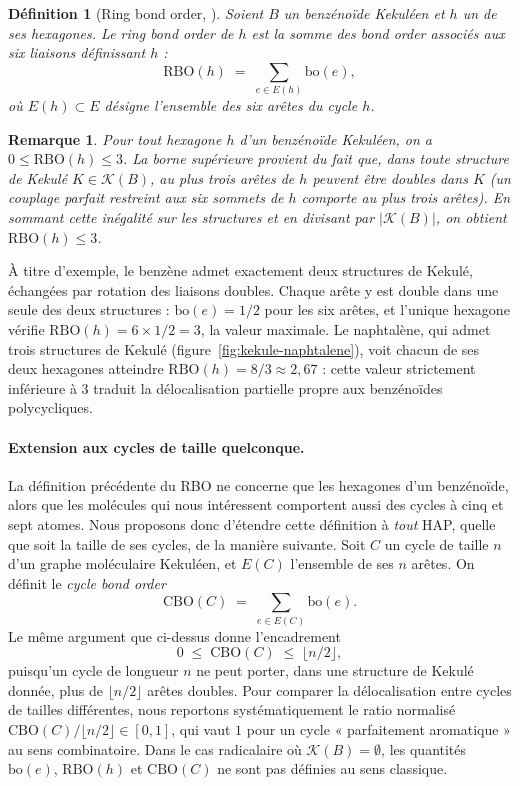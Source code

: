 \documentclass[11pt,a4paper]{article}
\newtheorem{definition}{Définition}
\newtheorem{remarque}{Remarque}
\begin{document}
\begin{definition}[Ring bond order, \cite{varet2022}]
Soient $B$ un benzénoïde Kekuléen et $h$ un de ses hexagones. Le
\emph{ring bond order} de $h$ est la somme des bond order associés aux
six liaisons définissant $h$ :
\[
  \mathrm{RBO}(h) \;=\; \sum_{e \in E(h)} \mathrm{bo}(e) ,
\]
où $E(h) \subset E$ désigne l'ensemble des six arêtes du cycle $h$.
\end{definition}

\begin{remarque}
Pour tout hexagone $h$ d'un benzénoïde Kekuléen, on a
$0 \le \mathrm{RBO}(h) \le 3$. La borne supérieure provient du fait que,
dans toute structure de Kekulé $K \in \mathcal{K}(B)$, au plus
\emph{trois} arêtes de $h$ peuvent être doubles dans $K$ (un couplage
parfait restreint aux six sommets de $h$ comporte au plus trois arêtes).
En sommant cette inégalité sur les structures et en divisant par
$|\mathcal{K}(B)|$, on obtient $\mathrm{RBO}(h) \le 3$.
\end{remarque}

À titre d'exemple, le benzène admet exactement deux structures de
Kekulé, échangées par rotation des liaisons doubles. Chaque arête y est
double dans une seule des deux structures : $\mathrm{bo}(e) = 1/2$ pour
les six arêtes, et l'unique hexagone vérifie
$\mathrm{RBO}(h) = 6 \times 1/2 = 3$, la valeur maximale. Le
naphtalène, qui admet trois structures de Kekulé
(figure~\ref{fig:kekule-naphtalene}), voit chacun de ses deux hexagones
atteindre $\mathrm{RBO}(h) = 8/3 \approx 2{,}67$ : cette valeur
strictement inférieure à $3$ traduit la délocalisation partielle propre
aux benzénoïdes polycycliques.

\paragraph{Extension aux cycles de taille quelconque.}
La définition précédente du RBO ne concerne que les hexagones d'un
benzénoïde, alors que les molécules qui nous intéressent comportent
aussi des cycles à cinq et sept atomes. Nous proposons donc d'étendre
cette définition à \emph{tout} HAP, quelle que soit la taille de ses
cycles, de la manière suivante. Soit $C$ un cycle de
taille $n$ d'un graphe moléculaire Kekuléen, et $E(C)$ l'ensemble de ses
$n$ arêtes. On définit le \emph{cycle bond order}
\[
  \mathrm{CBO}(C) \;=\; \sum_{e \in E(C)} \mathrm{bo}(e) .
\]
Le même argument que ci-dessus donne l'encadrement
\[
  0 \;\le\; \mathrm{CBO}(C) \;\le\; \lfloor n/2 \rfloor ,
\]
puisqu'un cycle de longueur $n$ ne peut porter, dans une structure de
Kekulé donnée, plus de $\lfloor n/2 \rfloor$ arêtes doubles. Pour
comparer la délocalisation entre cycles de tailles différentes, nous
reportons systématiquement le ratio normalisé
$\mathrm{CBO}(C) / \lfloor n/2 \rfloor \in [0, 1]$, qui vaut $1$ pour
un cycle « parfaitement aromatique » au sens combinatoire. Dans le cas
radicalaire où $\mathcal{K}(B) = \emptyset$, les quantités
$\mathrm{bo}(e)$, $\mathrm{RBO}(h)$ et $\mathrm{CBO}(C)$ ne sont pas
définies au sens classique.
\end{document}
